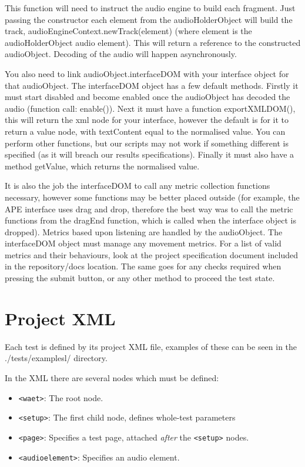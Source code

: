 \documentclass[11pt, oneside]{article}   	%
\begin{document}
				This function will need to instruct the audio engine to build each fragment. Just passing the constructor each element from the audioHolderObject will build the track, audioEngineContext.newTrack(element) (where element is the audioHolderObject audio element). This will return a reference to the constructed audioObject. Decoding of the audio will happen asynchronously.

				You also need to link audioObject.interfaceDOM with your interface object for that audioObject. The interfaceDOM object has a few default methods. Firstly it must start disabled and become enabled once the audioObject has decoded the audio (function call: enable()). Next it must have a function exportXMLDOM(), this will return the xml node for your interface, however the default is for it to return a value node, with textContent equal to the normalised value. You can perform other functions, but our scripts may not work if something different is specified (as it will breach our results specifications). Finally it must also have a method getValue, which returns the normalised value.

				It is also the job the interfaceDOM to call any metric collection functions necessary, however some functions may be better placed outside (for example, the APE interface uses drag and drop, therefore the best way was to call the metric functions from the dragEnd function, which is called when the interface object is dropped). Metrics based upon listening are handled by the audioObject. The interfaceDOM object must manage any movement metrics. For a list of valid metrics and their behaviours, look at the project specification document included in the repository/docs location. The same goes for any checks required when pressing the submit button, or any other method to proceed the test state.

	
\clearpage

\section{Project XML}

    Each test is defined by its project XML file, examples of these can be seen in the ./tests/examplesl/ directory.
    
    In the XML there are several nodes which must be defined:
	\begin{itemize}
	    \item \texttt{<waet>}: The root node.
	    \item \texttt{<setup>}: The first child node, defines whole-test parameters
	    \item \texttt{<page>}: Specifies a test page, attached \emph{after} the \texttt{<setup>} nodes.
	    \item \texttt{<audioelement>}: Specifies an audio element.
	\end{itemize}
\end{document}
